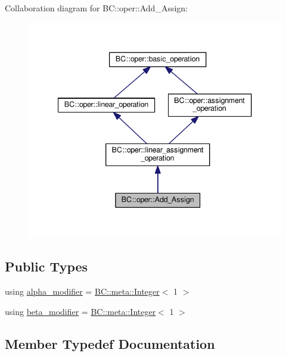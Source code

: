 Collaboration diagram for BC\+:\+:oper\+:\+:Add\+\_\+\+Assign\+:
\nopagebreak
\begin{figure}[H]
\begin{center}
\leavevmode
\includegraphics[width=340pt]{structBC_1_1oper_1_1Add__Assign__coll__graph}
\end{center}
\end{figure}
\subsection*{Public Types}
\begin{DoxyCompactItemize}
\item 
using \hyperlink{structBC_1_1oper_1_1Add__Assign_a20b991b7d4a8c7e4eb82d8953130001a}{alpha\+\_\+modifier} = \hyperlink{structBC_1_1meta_1_1Integer}{B\+C\+::meta\+::\+Integer}$<$ 1 $>$
\item 
using \hyperlink{structBC_1_1oper_1_1Add__Assign_aa9d7a564657d1254a78611b2b06d8744}{beta\+\_\+modifier} = \hyperlink{structBC_1_1meta_1_1Integer}{B\+C\+::meta\+::\+Integer}$<$ 1 $>$
\end{DoxyCompactItemize}


\subsection{Member Typedef Documentation}
